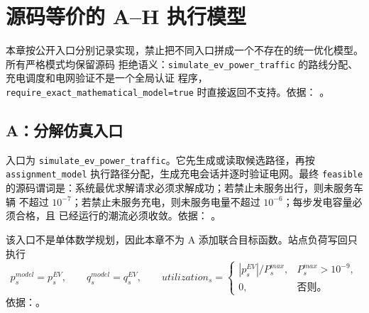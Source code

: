 \section{源码等价的 A--H 执行模型}
\label{sec:evpt-source-equivalent}

本章按公开入口分别记录实现，禁止把不同入口拼成一个不存在的统一优化模型。所有严格模式均保留源码
拒绝语义：\texttt{simulate\_ev\_power\_traffic} 的路线分配、充电调度和电网验证不是一个全局认证
程序，\texttt{require\_exact\_mathematical\_model=true} 时直接返回不支持。依据：
。

\subsection{A：分解仿真入口}
入口为 \texttt{simulate\_ev\_power\_traffic}。它先生成或读取候选路径，再按
\texttt{assignment\_model} 执行路径分配，生成充电会话并逐时验证电网。最终
\texttt{feasible} 的源码谓词是：系统最优求解请求必须求解成功；若禁止未服务出行，则未服务车辆
不超过 $10^{-7}$；若禁止未服务充电，则未服务电量不超过 $10^{-6}$；每步发电容量必须合格，且
已经运行的潮流必须收敛。依据：
。

该入口不是单体数学规划，因此本章不为 A 添加联合目标函数。站点负荷写回只执行
\begin{equation}
 p_s^{model}=p_s^{EV},\qquad q_s^{model}=q_s^{EV},\qquad
 utilization_s=\begin{cases}|p_s^{EV}|/P_s^{max},&P_s^{max}>10^{-9},\\0,&\text{否则。}\end{cases}
\end{equation}
依据：。

